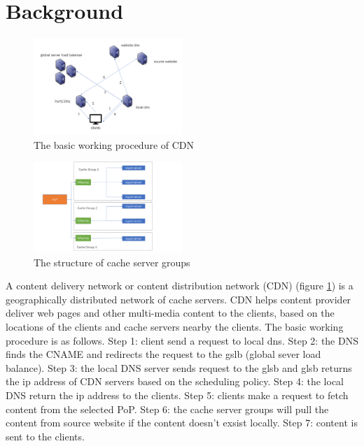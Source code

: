 \documentclass[5p]{elsarticle}
\begin{document}
\section{Background}
\begin{figure}[h]
    \centering
    \includegraphics[width=0.5\textwidth]{CDN_new.png}
    \caption{The basic working procedure of CDN}
    \label{fig:CDN}
\end{figure}

\begin{figure}[h]
    \centering
    \includegraphics[width=0.5\textwidth]{cache_group.png}
    \caption{The structure of cache server groups}
    \label{fig: the structure of PoP}
\end{figure}

A content delivery network or content distribution network (CDN) (figure \ref{fig:CDN}) is a geographically distributed network of cache servers. CDN helps content provider deliver web pages and other multi-media content to the clients, based on the locations of the clients and cache servers nearby the clients. The basic working procedure is as follows. Step 1: client send a request to local dns. Step 2: the DNS finds the CNAME and redirects the request to the gslb (global sever load balance). Step 3: the local DNS server sends request to the glsb and glsb returns the ip address of CDN servers based on the scheduling policy. Step 4: the local DNS return the ip address to the clients. Step 5: clients make a request to fetch content from the selected PoP. Step 6: the cache server groups will pull the content from source website if the content doesn't exsist locally. Step 7: content is sent to the clients.
\end{document}

